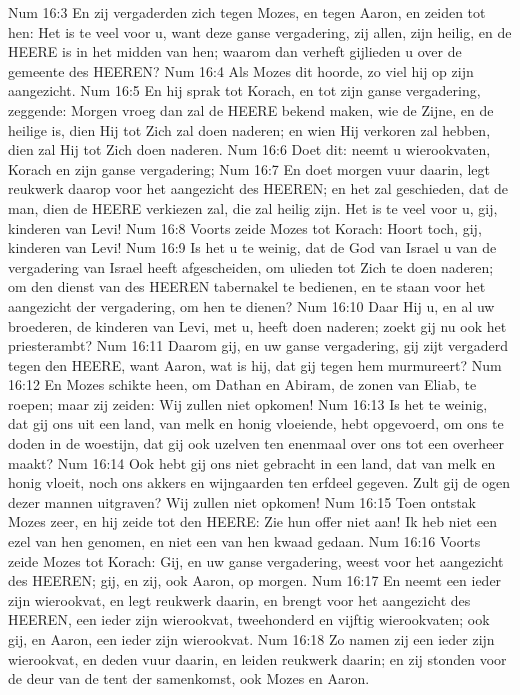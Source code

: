 Num 16:3  En zij vergaderden zich tegen Mozes, en tegen Aaron, en zeiden tot hen: Het is te veel voor u, want deze ganse vergadering, zij allen, zijn heilig, en de HEERE is in het midden van hen; waarom dan verheft gijlieden u over de gemeente des HEEREN?
Num 16:4  Als Mozes dit hoorde, zo viel hij op zijn aangezicht.
Num 16:5  En hij sprak tot Korach, en tot zijn ganse vergadering, zeggende: Morgen vroeg dan zal de HEERE bekend maken, wie de Zijne, en de heilige is, dien Hij tot Zich zal doen naderen; en wien Hij verkoren zal hebben, dien zal Hij tot Zich doen naderen.
Num 16:6  Doet dit: neemt u wierookvaten, Korach en zijn ganse vergadering;
Num 16:7  En doet morgen vuur daarin, legt reukwerk daarop voor het aangezicht des HEEREN; en het zal geschieden, dat de man, dien de HEERE verkiezen zal, die zal heilig zijn. Het is te veel voor u, gij, kinderen van Levi!
Num 16:8  Voorts zeide Mozes tot Korach: Hoort toch, gij, kinderen van Levi!
Num 16:9  Is het u te weinig, dat de God van Israel u van de vergadering van Israel heeft afgescheiden, om ulieden tot Zich te doen naderen; om den dienst van des HEEREN tabernakel te bedienen, en te staan voor het aangezicht der vergadering, om hen te dienen?
Num 16:10  Daar Hij u, en al uw broederen, de kinderen van Levi, met u, heeft doen naderen; zoekt gij nu ook het priesterambt?
Num 16:11  Daarom gij, en uw ganse vergadering, gij zijt vergaderd tegen den HEERE, want Aaron, wat is hij, dat gij tegen hem murmureert?
Num 16:12  En Mozes schikte heen, om Dathan en Abiram, de zonen van Eliab, te roepen; maar zij zeiden: Wij zullen niet opkomen!
Num 16:13  Is het te weinig, dat gij ons uit een land, van melk en honig vloeiende, hebt opgevoerd, om ons te doden in de woestijn, dat gij ook uzelven ten enenmaal over ons tot een overheer maakt?
Num 16:14  Ook hebt gij ons niet gebracht in een land, dat van melk en honig vloeit, noch ons akkers en wijngaarden ten erfdeel gegeven. Zult gij de ogen dezer mannen uitgraven? Wij zullen niet opkomen!
Num 16:15  Toen ontstak Mozes zeer, en hij zeide tot den HEERE: Zie hun offer niet aan! Ik heb niet een ezel van hen genomen, en niet een van hen kwaad gedaan.
Num 16:16  Voorts zeide Mozes tot Korach: Gij, en uw ganse vergadering, weest voor het aangezicht des HEEREN; gij, en zij, ook Aaron, op morgen.
Num 16:17  En neemt een ieder zijn wierookvat, en legt reukwerk daarin, en brengt voor het aangezicht des HEEREN, een ieder zijn wierookvat, tweehonderd en vijftig wierookvaten; ook gij, en Aaron, een ieder zijn wierookvat.
Num 16:18  Zo namen zij een ieder zijn wierookvat, en deden vuur daarin, en leiden reukwerk daarin; en zij stonden voor de deur van de tent der samenkomst, ook Mozes en Aaron.
